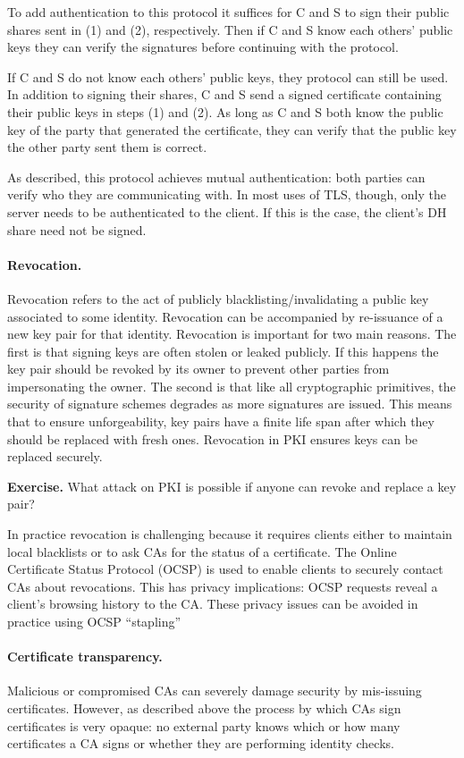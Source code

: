 To add authentication to this protocol it suffices for C and S
to sign their public shares sent in (1) and (2), respectively.
Then if C and S know each others' public keys they can verify
the signatures before continuing with the protocol.

If C and S do not know each others' public keys, they protocol
can still be used. In addition to signing their shares, C and S
send a signed certificate containing their public keys in steps
(1) and (2). As long as C and S both know the public key of the party
that generated the certificate, they can verify that the public
key the other party sent them is correct. 

As described, this protocol achieves mutual authentication: both parties
can verify who they are communicating with. In most uses of TLS, though,
only the server needs to be authenticated to the client. If this is the case,
the client's DH share need not be signed.

\paragraph{Revocation.} Revocation refers to the act of publicly blacklisting/invalidating
a public key associated to some identity. Revocation can be accompanied by re-issuance of
a new key pair for that identity. Revocation is important for two main reasons. The first
is that signing keys are often stolen or leaked publicly. If this happens the key pair
should be revoked by its owner to prevent other parties from impersonating the owner.
The second is that like all cryptographic primitives, the security of signature schemes
degrades as more signatures are issued. This means that to ensure unforgeability, key pairs
have a finite life span after which they should be replaced with fresh ones. Revocation
in PKI ensures keys can be replaced securely.

\noindent\textbf{Exercise.} What attack on PKI is possible if anyone can revoke and replace
a key pair?

In practice revocation is challenging because it requires clients either to maintain local blacklists
or to ask CAs for the status of a certificate. The Online Certificate Status Protocol (OCSP)
is used to enable clients to securely contact CAs about revocations. This has privacy
implications: OCSP requests reveal a client's browsing history to the CA. These privacy issues
can be avoided in practice using OCSP ``stapling''~\cite{...}

\paragraph{Certificate transparency.} Malicious or compromised CAs can severely damage
security by mis-issuing certificates. However, as described above the process by which CAs
sign certificates is very opaque: no external party knows which or how many certificates
a CA signs or whether they are performing identity checks.

